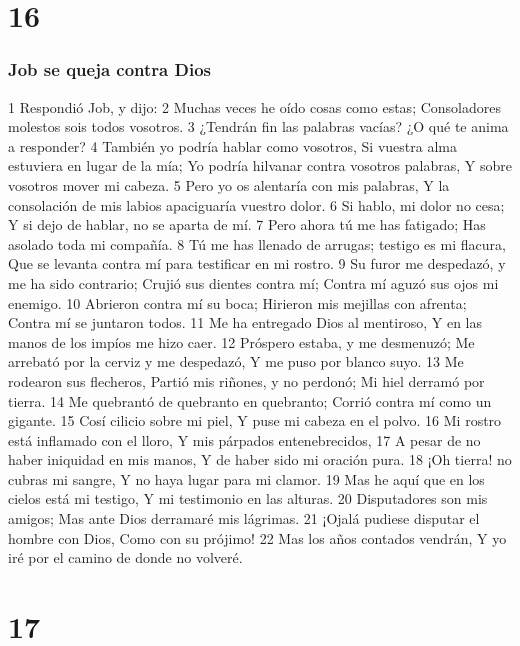 \chapter{16}

\subsection*{Job se queja contra Dios}  

1 Respondió Job, y dijo:  
2 Muchas veces he oído cosas como estas;  
Consoladores molestos sois todos vosotros.  
3 ¿Tendrán fin las palabras vacías?  
¿O qué te anima a responder?  
4 También yo podría hablar como vosotros,  
Si vuestra alma estuviera en lugar de la mía;  
Yo podría hilvanar contra vosotros palabras,  
Y sobre vosotros mover mi cabeza.  
5 Pero yo os alentaría con mis palabras,  
Y la consolación de mis labios apaciguaría vuestro dolor. 
6 Si hablo, mi dolor no cesa;  
Y si dejo de hablar, no se aparta de mí.  
7 Pero ahora tú me has fatigado;  
Has asolado toda mi compañía.  
8 Tú me has llenado de arrugas; testigo es mi flacura,  
Que se levanta contra mí para testificar en mi rostro.  
9 Su furor me despedazó, y me ha sido contrario;  
Crujió sus dientes contra mí;  
Contra mí aguzó sus ojos mi enemigo.  
10 Abrieron contra mí su boca;  
Hirieron mis mejillas con afrenta;  
Contra mí se juntaron todos.  
11 Me ha entregado Dios al mentiroso,  
Y en las manos de los impíos me hizo caer.  
12 Próspero estaba, y me desmenuzó;  
Me arrebató por la cerviz y me despedazó, 
Y me puso por blanco suyo.  
13 Me rodearon sus flecheros,  
Partió mis riñones, y no perdonó;  
Mi hiel derramó por tierra.  
14 Me quebrantó de quebranto en quebranto;  
Corrió contra mí como un gigante.  
15 Cosí cilicio sobre mi piel,  
Y puse mi cabeza en el polvo.  
16 Mi rostro está inflamado con el lloro,  
Y mis párpados entenebrecidos,  
17 A pesar de no haber iniquidad en mis manos,  
Y de haber sido mi oración pura.  
18 ¡Oh tierra! no cubras mi sangre,  
Y no haya lugar para mi clamor.  
19 Mas he aquí que en los cielos está mi testigo,  
Y mi testimonio en las alturas.  
20 Disputadores son mis amigos;  
Mas ante Dios derramaré mis lágrimas.  
21 ¡Ojalá pudiese disputar el hombre con Dios,  
Como con su prójimo!  
22 Mas los años contados vendrán,  
Y yo iré por el camino de donde no volveré.  

\chapter{17}


